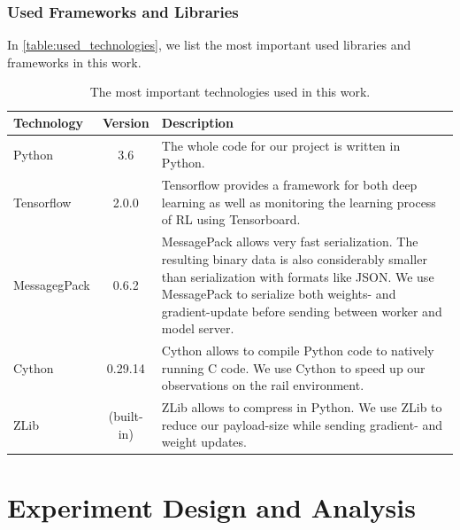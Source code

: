 \subsection*{Used Frameworks and Libraries}\label{framework_and_libraries}
In \autoref{table:used_technologies}, we list the most important used libraries and frameworks in this work.
\begin{table}[H]
	\centering
	\begin{tabularx}{\textwidth}{ |l|c|X| } 
		\hline
		\textbf{Technology}	& \textbf{Version} & \textbf{Description}\\
		\hline
		Python & 3.6 & The whole code for our project is written in Python.\\
		\hline
		Tensorflow & 2.0.0 & Tensorflow provides a framework for both deep learning as well as monitoring the learning process of RL using Tensorboard.\\
		\hline
		MessagegPack & 0.6.2 & MessagePack allows very fast serialization. The resulting binary data is also considerably smaller than serialization with formats like JSON. We use MessagePack to serialize both weights- and gradient-update before sending between worker and model server.\\
		\hline
		Cython & 0.29.14 & Cython allows to compile Python code to natively running C code. We use Cython to speed up our observations on the rail environment.\\
		\hline
		ZLib & (built-in) & ZLib allows to compress in Python. We use ZLib to reduce our payload-size while sending gradient- and weight updates.\\
		\hline
	\end{tabularx}
	\caption{The most important technologies used in this work.}
	\label{table:used_technologies}
\end{table}
\chapter{Experiment Design and Analysis}
\label{chap.experiment}

